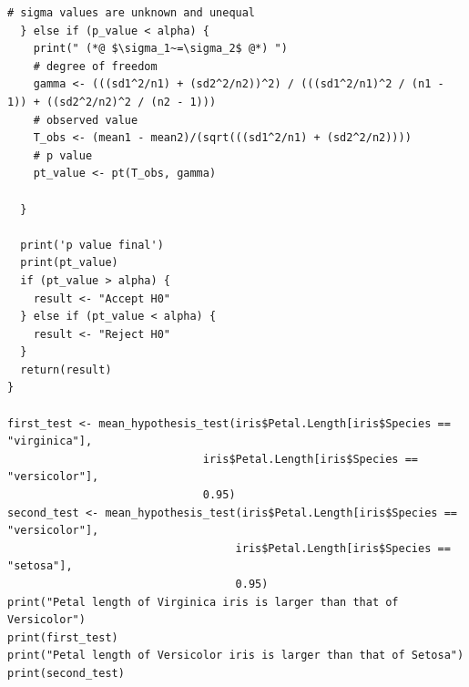 \documentclass{article}
\begin{document}
\begin{lstlisting}[style=R]
    # sigma values are unknown and unequal
  } else if (p_value < alpha) {
    print(" (*@ $\sigma_1~=\sigma_2$ @*) ")
    # degree of freedom
    gamma <- (((sd1^2/n1) + (sd2^2/n2))^2) / (((sd1^2/n1)^2 / (n1 - 1)) + ((sd2^2/n2)^2 / (n2 - 1)))
    # observed value
    T_obs <- (mean1 - mean2)/(sqrt(((sd1^2/n1) + (sd2^2/n2))))
    # p value
    pt_value <- pt(T_obs, gamma)
    
  }
  
  print('p value final')
  print(pt_value)
  if (pt_value > alpha) {
    result <- "Accept H0"
  } else if (pt_value < alpha) {
    result <- "Reject H0"
  }
  return(result)
}
    
first_test <- mean_hypothesis_test(iris$Petal.Length[iris$Species == "virginica"],
                              iris$Petal.Length[iris$Species == "versicolor"],
                              0.95)
second_test <- mean_hypothesis_test(iris$Petal.Length[iris$Species == "versicolor"],
                                   iris$Petal.Length[iris$Species == "setosa"],
                                   0.95)
print("Petal length of Virginica iris is larger than that of Versicolor")
print(first_test)
print("Petal length of Versicolor iris is larger than that of Setosa")
print(second_test)

\end{lstlisting}
\end{document}
